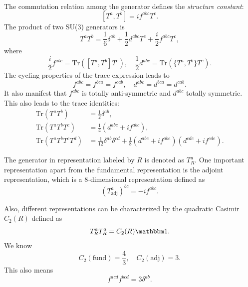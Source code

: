 \documentclass[aps,prb,superscriptaddress,nofootinbib]{revtex4}
\begin{document}
The commutation relation among the generator defines the \textit{structure constant}:
\begin{equation}
	\left[T^a, T^b\right] = i f^{abc} T^c.
\end{equation}
The product of two SU(3) generators is
\begin{equation}
	T^a T^b = \frac{1}{6}\delta^{ab} + \frac{1}{2} d^{abc} T^c + \frac{i}{2} f^{abc} T^c,
\end{equation}
where
\begin{equation}
	\frac{i}{2} f^{abc} = \mathrm{Tr}\left([T^a,T^b]T^c \right), \quad
	\frac{1}{2} d^{abc} = \mathrm{Tr}\left(\{T^a,T^b\}T^c \right).
\end{equation}
The cycling properties of the trace expression leads to 
\begin{equation}
	f^{abc} = f^{bca} = f^{cab}, \quad
	d^{abc} = d^{bca} = d^{cab}.
\end{equation}
It also manifest that $f^{abc}$ is totally anti-symmetric and $d^{abc}$ totally symmetric.
This also leads to the trace identities:
\begin{equation}
\begin{aligned}
	\mathrm{Tr}(T^a T^b) &= \frac{1}{2}\delta^{ab}, \\
	\mathrm{Tr}(T^a T^b T^c) &= \frac{1}{4}(d^{abc} + if^{abc}), \\
	\mathrm{Tr}(T^a T^b T^c T^d) &= \frac{1}{12} \delta^{ab}\delta^{cd} + \frac{1}{8}(d^{abe}+if^{abe})(d^{cde}+if^{cde}).
\end{aligned}
\end{equation}

The generator in representation labeled by $R$ is denoted as $T_R^a$.
One important representation apart from the fundamental representation is the adjoint representation, which is a 8-dimensional representation defined as
\begin{equation}
	(T^a_{\mathrm{adj}})^{bc} = -i f^{abc}.
\end{equation}

Also, different representations can be characterized by the quadratic Casimir $C_2(R)$ defined as
\begin{equation}
	T^a_R T^a_R = C_2(R) \mathbbm 1.
\end{equation}
We know
\begin{equation}
	C_2(\text{fund}) = \frac{4}{3},\quad
	C_2(\text{adj}) =3.
\end{equation}
This also means
\begin{equation}
	f^{acd} f^{bcd} = 3 \delta^{ab}.
\end{equation}
\end{document}
